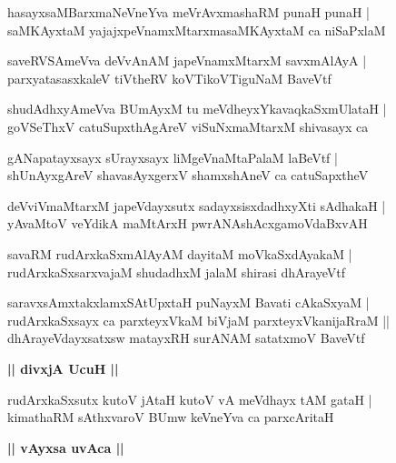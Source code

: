 \documentclass[twoside,12pt,openright]{book}
\newcounter{shloka}[chapter]
\def\uvaca#1{\centerline{{\large\textbf{#1}}}}
\begin{document}
\begin{shloka}%
hasayxsaMBarxmaNeVneYva meVrAvxmashaRM punaH punaH |\\
saMKAyxtaM yajajxpeVnamxMtarxmasaMKAyxtaM ca niSaPxlaM 
\end{shloka}

\begin{shloka}%
saveRVSAmeVva deVvAnAM japeVnamxMtarxM savxmAlAyA |\\
parxyatasasxkaleV tiVtheRV koVTikoVTiguNaM BaveVtf
\end{shloka}

\begin{shloka}%
shudAdhxyAmeVva BUmAyxM tu meVdheyxYkavaqkaSxmUlataH |\\
goVSeThxV catuSupxthAgAreV viSuNxmaMtarxM shivasayx ca 
\end{shloka}

\begin{shloka}%
gANapatayxsayx sUrayxsayx liMgeVnaMtaPalaM laBeVtf |\\
shUnAyxgAreV shavasAyxgerxV shamxshAneV ca catuSapxtheV
\end{shloka}

\begin{shloka}%
deVviVmaMtarxM japeVdayxsutx sadayxsisxdadhxyXti sAdhakaH |\\
yAvaMtoV veYdikA maMtArxH pwrANAshAcxgamoVdaBxvAH 
\end{shloka}

\begin{shloka}%
savaRM rudArxkaSxmAlAyAM dayitaM moVkaSxdAyakaM |\\
rudArxkaSxsarxvajaM shudadhxM jalaM shirasi dhArayeVtf
\end{shloka}

\begin{shloka}%
saravxsAmxtakxlamxSAtUpxtaH puNayxM Bavati cAkaSxyaM |\\
rudArxkaSxsayx ca parxteyxVkaM biVjaM parxteyxVkanijaRraM ||\\
dhArayeVdayxsatxsw matayxRH surANAM satatxmoV BaveVtf
\end{shloka}

\uvaca{|| divxjA UcuH ||}

\begin{shloka}%
rudArxkaSxsutx kutoV jAtaH kutoV vA meVdhayx tAM gataH |\\
kimathaRM sAthxvaroV BUmw keVneYva ca parxcAritaH 
\end{shloka}

\uvaca{|| vAyxsa uvAca ||}
\end{document}
